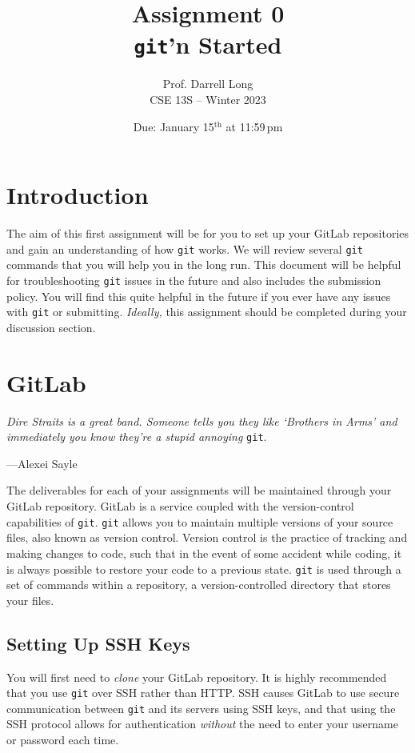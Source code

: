 \documentclass[11pt]{article}
\title{Assignment 0 \\ \texttt{git}'n Started}
\author{Prof. Darrell Long \\ CSE 13S -- Winter 2023}
\date{Due: January 15$^\text{th}$ at 11:59\,pm}
\begin{document}
\maketitle

\section{Introduction}

\noindent The aim of this first assignment will be for you to set up your
GitLab repositories and gain an understanding of how \texttt{git} works.
We will review several \texttt{git} commands that you will help you in the long
run. This document will be helpful for troubleshooting \texttt{git} issues in
the future and also includes the submission policy. You will find this quite
helpful in the future if you ever have any issues with \texttt{git} or
submitting. \emph{Ideally,} this assignment should be completed during your
discussion section.

\section{GitLab}

\renewcommand{\epigraphsize}{\small}
\textwidth
\epigraph{\emph{Dire Straits is a great band. Someone tells you they like
`Brothers in Arms' and immediately you know they're a stupid annoying}
\texttt{git}.}{---Alexei Sayle}

\noindent The deliverables for each of your assignments will be maintained
through your GitLab repository. GitLab is a service coupled with the
version-control capabilities of \texttt{git}. \texttt{git} allows you to
maintain multiple versions of your source files, also known as version control.
Version control is the practice of tracking and making changes to code, such
that in the event of some accident while coding, it is always possible to
restore your code to a previous state. \texttt{git} is used
through a set of commands within a repository, a version-controlled directory
that stores your files.

\subsection{Setting Up SSH Keys}

You will first need to \emph{clone} your GitLab repository. It is highly
recommended that you use \texttt{git} over SSH rather than HTTP.  SSH causes
GitLab to use secure communication between \texttt{git} and its servers using
SSH keys, and that using the SSH protocol allows for authentication
\emph{without} the need to enter your username or password each time.
\end{document}
